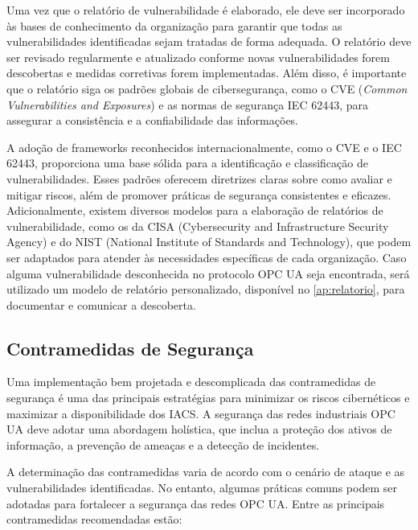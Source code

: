         Uma vez que o relatório de vulnerabilidade é elaborado, ele deve ser incorporado às bases de conhecimento da organização para garantir que todas as vulnerabilidades identificadas sejam tratadas de forma adequada. O relatório deve ser revisado regularmente e atualizado conforme novas vulnerabilidades forem descobertas e medidas corretivas forem implementadas. Além disso, é importante que o relatório siga os padrões globais de cibersegurança, como o CVE (\textit{Common Vulnerabilities and Exposures}) e as normas de segurança IEC 62443, para assegurar a consistência e a confiabilidade das informações.

        A adoção de frameworks reconhecidos internacionalmente, como o CVE e o IEC 62443, proporciona uma base sólida para a identificação e classificação de vulnerabilidades. Esses padrões oferecem diretrizes claras sobre como avaliar e mitigar riscos, além de promover práticas de segurança consistentes e eficazes. Adicionalmente, existem diversos modelos para a elaboração de relatórios de vulnerabilidade, como os da CISA (Cybersecurity and Infrastructure Security Agency) e do NIST (National Institute of Standards and Technology), que podem ser adaptados para atender às necessidades específicas de cada organização. Caso alguma vulnerabilidade desconhecida no protocolo OPC UA seja encontrada, será utilizado um modelo de relatório personalizado, disponível no \autoref{ap:relatorio}, para documentar e comunicar a descoberta.

    \subsection{Contramedidas de Segurança}

        Uma implementação bem projetada e descomplicada das contramedidas de segurança é uma das principais estratégias para minimizar os riscos cibernéticos e maximizar a disponibilidade dos IACS. A segurança das redes industriais OPC UA deve adotar uma abordagem holística, que inclua a proteção dos ativos de informação, a prevenção de ameaças e a detecção de incidentes.

        A determinação das contramedidas varia de acordo com o cenário de ataque e as vulnerabilidades identificadas. No entanto, algumas práticas comuns podem ser adotadas para fortalecer a segurança das redes OPC UA. Entre as principais contramedidas recomendadas estão:

